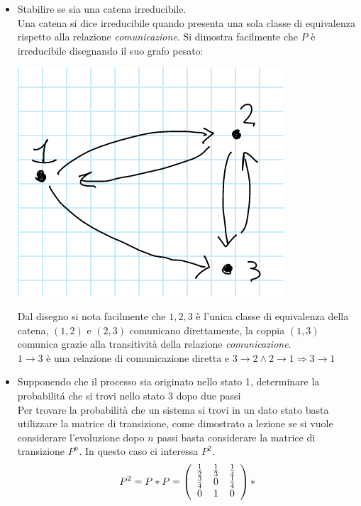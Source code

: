 \documentclass[a4paper]{article}
\begin{document}
\begin{itemize}
	\item Stabilire se sia una catena irreducibile.\\
	Una catena si dice irreducibile quando presenta una sola classe di equivalenza rispetto alla relazione \textit{comunicazione}.
		Si dimostra facilmente che $P$ è irreducibile disegnando il suo grafo pesato:\\
		\begin{center}\includegraphics[scale=0.3]{grafo.png}\end{center}
		Dal disegno si nota facilmente che ${1,2,3}$ è l'unica classe di equivalenza della catena, $(1,2)$ e $(2,3)$ comunicano direttamente, la coppia $(1,3)$ comunica grazie alla transitività della relazione \textit{comunicazione}.\\
		$ 1 \rightarrow 3$ è una relazione di comunicazione diretta e $3 \rightarrow 2 \land 2 \rightarrow 1 \Rightarrow 3 \rightarrow 1$ 
	\item Supponendo che il processo sia originato nello stato 1, determinare la probabilitá che si trovi nello stato 3 dopo due passi\\
		Per trovare la probabilità che un sistema si trovi in un dato stato basta utilizzare la matrice di transizione, come dimostrato a lezione se si vuole considerare l'evoluzione dopo $n$ passi basta considerare la matrice di transizione $P^n$. In questo caso ci interessa $P^2$.\\
		$$P^2=P*P= \left(\begin{array}{c c c}{{\frac{1}{2}}}&{{\frac{1}{3}}}&{{\frac{1}{4}}}\\ {{\frac{3}{4}}}&{{0}}&{{\frac{1}{4}}}\\ {{0}}&{{1}}&{{0}}\end{array}\right) *
$$
\end{itemize}
\end{document}
